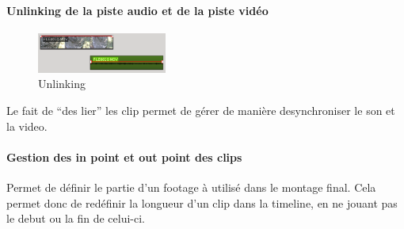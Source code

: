 \paragraph{}
\paragraph{Unlinking de la piste audio et de la piste vidéo}
  \begin{figure}
    \vspace{-20pt}
    \begin{center}
      \includegraphics[width=0.38\textwidth]{images/unlinked}
    \end{center}
    \vspace{-20pt}
    \caption{Unlinking}
    \label{Yes}
  \end{figure}
  Le fait de ``des lier'' les clip permet de gérer de manière desynchroniser le son
  et la video.

\paragraph{Gestion des in point et  out point des clips} %
  Permet de définir le partie d'un footage à utilisé dans le montage final. Cela permet donc de
  redéfinir la longueur d'un clip dans la timeline, en ne jouant pas le debut
  ou la fin de celui-ci.

\paragraph{}

